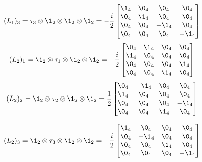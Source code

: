\begin{align*}
    (L_1)_3&=\tau_3\otimes\1_2\otimes\1_2\otimes\1_2=-\frac{i}{2}\begin{bmatrix}
        \1_4&\0_4&\0_4&\0_4\\
        \0_4&\1_4&\0_4&\0_4\\
        \0_4&\0_4&-\1_4&\0_4\\
        \0_4&\0_4&\0_4&-\1_4
    \end{bmatrix}
\end{align*}
\begin{align*}
    (L_2)_1&=\1_2\otimes\tau_1\otimes\1_2\otimes\1_2=-\frac{i}{2}\begin{bmatrix}
        \0_4&\1_4&\0_4&\0_4\\
        \1_4&\0_4&\0_4&\0_4\\
        \0_4&\0_4&\0_4&\1_4\\
        \0_4&\0_4&\1_4&\0_4
    \end{bmatrix}
\end{align*}
\begin{align*}
    (L_2)_2&=\1_2\otimes\tau_2\otimes\1_2\otimes\1_2=\frac{1}{2}\begin{bmatrix}
        \0_4&-\1_4&\0_4&\0_4\\
        \1_4&\0_4&\0_4&\0_4\\
        \0_4&\0_4&\0_4&-\1_4\\
        \0_4&\0_4&\1_4&\0_4
    \end{bmatrix}
\end{align*}

\begin{align*}
    (L_2)_3&=\1_2\otimes\tau_3\otimes\1_2\otimes\1_2=-\frac{i}{2}\begin{bmatrix}
        \1_4&\0_4&\0_4&\0_4\\
        \0_4&-\1_4&\0_4&\0_4\\
        \0_4&\0_4&\1_4&\0_4\\
        \0_4&\0_4&\0_4&-\1_4
    \end{bmatrix}
\end{align*}



